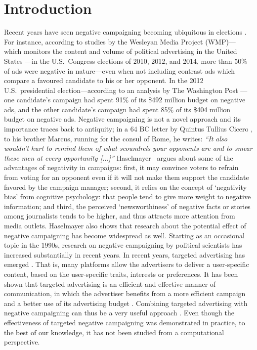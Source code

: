 \documentclass[letterpaper]{article} %
\begin{document}
\section{Introduction}
Recent years have seen negative campaigning becoming ubiquitous in elections \cite{mattes2014positive}. For instance, according to studies by the Wesleyan Media Project (WMP)---which monitors the content and volume of political advertising in the United States \cite{fowler2014political}---in the U.S.\ Congress elections of 2010, 2012, and 2014, more than 50\% of ads were negative in nature---even when not including contrast ads which compare a favoured candidate to his or her opponent. In the 2012 U.S.\ presidential election---according to an analysis by The Washington Post \cite{andrews2012}---
one candidate's campaign had spent 91\% of its \$492 million budget on negative ads, and the other candidate's campaign had spent 85\% of its \$404 million budget on negative ads.
Negative campaigning is not a novel approach and its importance  traces back to antiquity; in a 64 BC letter by Quintus Tullius Cicero \cite{cicero2012win}, to his brother Marcus, running for the consul of Rome,  he writes: \emph{``It also wouldn't hurt to remind them of what scoundrels your opponents are and to smear these men at every opportunity [...]''}
Haselmayer~ argues about some of the advantages of negativity in campaigns: first, it may convince voters to refrain from voting for an opponent even if it will not make them support the candidate favored by the campaign manager; second, it relies on the concept of `negativity bias' from cognitive psychology: that people tend to give more weight to negative information; and third, the perceived `newsworthiness' of negative facts or stories among journalists
tends to be higher, and thus attracts more attention from media outlets.
Haselmayer also shows that research about the potential effect of negative campaigning has become widespread as well. Starting as an occasional topic in the 1990s, research on negative campaigning by political scientists has increased substantially in recent years.
In recent years, targeted advertising has emerged \cite{johnson2013targeted}. That is, many platforms allow the advertisers to deliver a user-specific content, based on the user-specific traits, interests or preferences. It has been shown that targeted advertising is an efficient and effective manner of communication, in which the advertiser benefits from a more efficient campaign and a better use of its advertising budget \cite{iyer2005targeting}. Combining targeted advertising with negative campaigning can thus be a very useful approach \cite{guardian-trump-facebook-ad}. Even though the effectiveness of targeted negative campaigning was demonstrated in practice, to the best of our knowledge, it has not been studied from a computational perspective.
\end{document}
